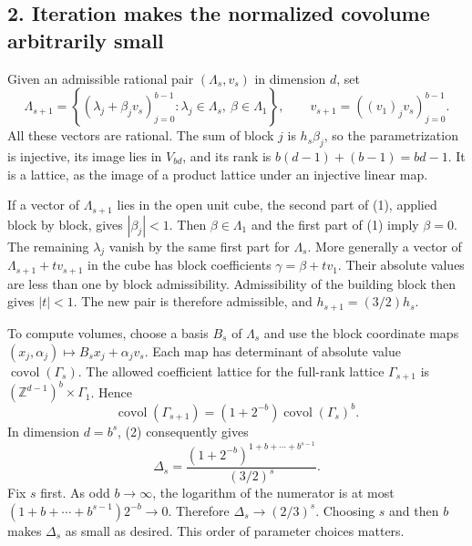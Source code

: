 \subsection{2. Iteration makes the normalized covolume arbitrarily small}
Given an admissible rational pair $(\Lambda_s,v_s)$ in dimension $d$, set
\[
 \Lambda_{s+1}=\left\{(\lambda_j+\beta_jv_s)_{j=0}^{b-1}:
       \lambda_j\in\Lambda_s,\ \beta\in\Lambda_1\right\},
 \qquad v_{s+1}=((v_1)_jv_s)_{j=0}^{b-1}.                 \tag{3}
\]
All these vectors are rational. The sum of block $j$ is $h_s\beta_j$,
so the parametrization is injective, its image lies in $V_{bd}$, and
its rank is $b(d-1)+(b-1)=bd-1$. It is a lattice, as the image of a
product lattice under an injective linear map.

If a vector of $\Lambda_{s+1}$ lies in the open unit cube, the second
part of (1), applied block by block, gives $|\beta_j|<1$. Then
$\beta\in\Lambda_1$ and the first part of (1) imply $\beta=0$.
The remaining $\lambda_j$ vanish by the same first part for $\Lambda_s$.
More generally a vector of $\Lambda_{s+1}+t v_{s+1}$ in the cube has
block coefficients $\gamma=\beta+t v_1$. Their absolute values are
less than one by block admissibility. Admissibility of the building
block then gives $|t|<1$. The new pair is therefore admissible, and
$h_{s+1}=(3/2)h_s$.

To compute volumes, choose a basis $B_s$ of $\Lambda_s$ and use the
block coordinate maps $(x_j,\alpha_j)\mapsto B_sx_j+\alpha_jv_s$.
Each map has determinant of absolute value
$\operatorname{covol}(\Gamma_s)$. The allowed coefficient lattice for
the full-rank lattice $\Gamma_{s+1}$ is
$(\mathbb Z^{d-1})^b\times\Gamma_1$. Hence
\[
 \operatorname{covol}(\Gamma_{s+1})
 =(1+2^{-b})\operatorname{covol}(\Gamma_s)^b.
\]
In dimension $d=b^s$, (2) consequently gives
\[
 \Delta_s=
 \frac{(1+2^{-b})^{1+b+\cdots+b^{s-1}}}{(3/2)^s}.       \tag{4}
\]
Fix $s$ first. As odd $b\to\infty$, the logarithm of the numerator is
at most $(1+b+\cdots+b^{s-1})2^{-b}\to0$. Therefore
$\Delta_s\to(2/3)^s$. Choosing $s$ and then $b$ makes $\Delta_s$ as
small as desired. This order of parameter choices matters.


